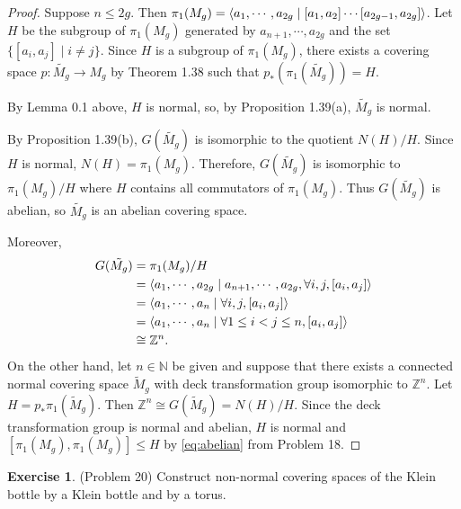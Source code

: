 \documentclass[12pt, psamsfonts]{amsart}
\theoremstyle{definition}
\newtheorem*{exer}{Exercise}
\theoremstyle{remark}
\numberwithin{equation}{section}
\begin{document}
\begin{proof}
  Suppose $n \leq 2g$.
  Then $\pi_1(M_g) = \ev{a_1, \cdots, a_{2g} \mid [a_1, a_2] \cdots [a_{2g - 1}, a_{2g}]}$.
  Let $H$ be the subgroup of $\pi_1(M_g)$ generated by $a_{n + 1}, \cdots, a_{2g}$ and the set $\{ [a_i, a_j] \mid i \ne j \}$.
  Since $H$ is a subgroup of $\pi_1(M_g)$, there exists a covering space $p: \tilde{M_g} \rightarrow M_g$ by Theorem 1.38 such that $p_*(\pi_1(\tilde{M_g})) = H$.

  By Lemma 0.1 above, $H$ is normal, so, by Proposition 1.39(a), $\tilde{M_g}$ is normal.

  By Proposition 1.39(b), $G(\tilde{M_g})$ is isomorphic to the quotient $N(H) / H$.
  Since $H$ is normal, $N(H) = \pi_1(M_g)$.
  Therefore, $G(\tilde{M_g})$ is isomorphic to $\pi_1(M_g) / H$ where $H$ contains all commutators of $\pi_1(M_g)$.
  Thus $G(\tilde{M_g})$ is abelian, so $\tilde{M_g}$ is an abelian covering space.

  Moreover,
  \begin{align*}
    G(\tilde{M_g})
      &= \pi_1(M_g) / H \\
      &= \ev{a_1, \cdots, a_{2g} \mid a_{n + 1}, \cdots, a_{2g}, \forall i, j, [a_i, a_j]} \\
      &= \ev{a_{1}, \cdots, a_{n} \mid \forall i, j, [a_i, a_j]} \\
      &= \ev{a_{1}, \cdots, a_{n} \mid \forall 1 \leq i < j \leq n, [a_i, a_j]} \\
      &\cong \mathbb{Z}^n.
  \end{align*}
  On the other hand, let $n \in \mathbb{N}$ be given and suppose that there exists a connected normal covering space $\tilde{M}_g$ with deck transformation group isomorphic to $\mathbb{Z}^n$.
  Let $H = p_*\pi_1(\tilde{M}_g)$.
  Then $\mathbb{Z}^n \cong G(\tilde{M}_g) = N(H) / H$.
  Since the deck transformation group is normal and abelian, $H$ is normal and $[\pi_1(M_g), \pi_1(M_g)] \leq H$ by \eqref{eq:abelian} from Problem 18.  

\end{proof}

\begin{exer}{(Problem 20)}
  Construct non-normal covering spaces of the Klein bottle by a Klein bottle and by a torus.
\end{exer}
\end{document}
